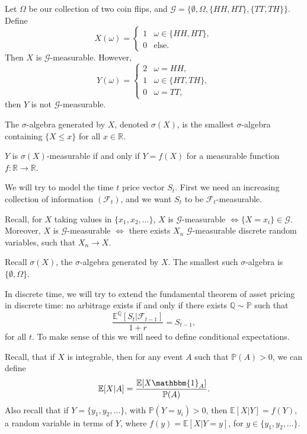 \documentclass[12pt]{article}
\begin{document}
\begin{exbox}
	Let $\Omega$ be our collection of two coin flips, and $\mathcal{G} = \{\emptyset, \Omega, \{HH, HT\}, \{TT, TH\}\}$. Define
	\[
	X(\omega) =
	\begin{cases}
		1 & \omega \in \{HH, HT\}, \\
		0 &\text{else}.
	\end{cases}
	\]
	Then $X$ is $\mathcal{G}$-measurable. However,
	\[
	Y(\omega) =
	\begin{cases}
		2 & \omega = HH,\\
		1 & \omega \in \{HT, TH\},\\
		0 & \omega = TT,
	\end{cases}
	\]
	then $Y$ is not $\mathcal{G}$-measurable.
\end{exbox}

\begin{definition}
	The $\sigma$-algebra generated by $X$, denoted $\sigma(X)$, is the smallest $\sigma$-algebra containing $\{X \leq x\}$ for all $x \in \mathbb{R}$.
\end{definition}

\begin{theorem}
	$Y$ is $\sigma(X)$-measurable if and only if $Y = f(X)$ for a measurable function $f : \mathbb{R} \to \mathbb{R}$.
\end{theorem}


We will try to model the time $t$ price vector $S_t$. First we need an increasing collection of information $(\mathcal{F}_t)$, and we want $S_t$ to be $\mathcal{F}_t$-measurable.

Recall, for $X$ taking values in $\{x_1, x_2, \ldots\}$, $X$ is $\mathcal{G}$-measurable $\iff \{X = x_i\} \in \mathcal{G}$. Moreover, $X$ is $\mathcal{G}$-measurable $\iff $ there exists $X_n$ $\mathcal{G}$-measurable discrete random variables, such that $X_n \to X$.

Recall $\sigma(X)$, the $\sigma$-algebra generated by $X$. The smallest such $\sigma$-algebra is $\{\emptyset, \Omega\}$.

In discrete time, we will try to extend the fundamental theorem of asset pricing in discrete time: no arbitrage exists if and only if there exists $\mathbb{Q} \sim \mathbb{P}$ such that
\[
\frac{\mathbb{E}^{\mathbb{Q}}[S_t|\mathcal{F}_{t-1}]}{1+r} = S_{t-1},
\]
for all $t$. To make sense of this we will need to define conditional expectations.

Recall, that if $X$ is integrable, then for any event $A$ such that $\mathbb{P}(A) > 0$, we can define
\[
\mathbb{E}[X|A] = \frac{\mathbb{E}[X \mathbbm{1}_{A}]}{\mathbb{P}(A)}.
\]
Also recall that if $Y = \{y_1, y_2, \ldots\}$, with $\mathbb{P}(Y = y_i) > 0$, then $\mathbb{E}[X | Y] = f(Y)$, a random variable in terms of $Y$, where $f(y) = \mathbb{E}[X|Y = y]$, for $y \in \{y_1, y_2, \ldots\}$.
\end{document}
